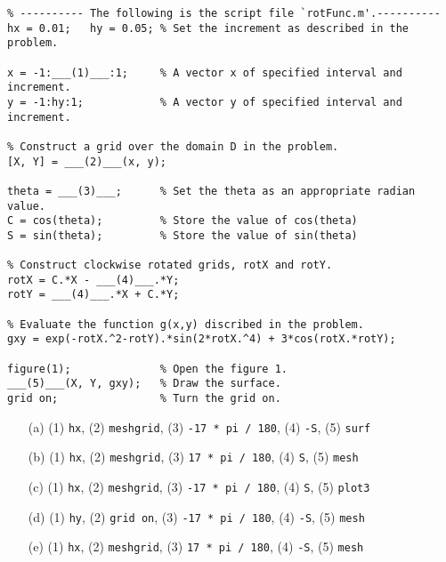 \documentclass[11pt,a4paper]{article}
\begin{document}
\begin{enumerate}
\begin{enumerate}
    \vspace{2mm}

    \begin{verbatim}
% ---------- The following is the script file `rotFunc.m'.----------
hx = 0.01;   hy = 0.05; % Set the increment as described in the problem.

x = -1:___(1)___:1;     % A vector x of specified interval and increment.
y = -1:hy:1;            % A vector y of specified interval and increment.

% Construct a grid over the domain D in the problem.
[X, Y] = ___(2)___(x, y);

theta = ___(3)___;      % Set the theta as an appropriate radian value.
C = cos(theta);         % Store the value of cos(theta)
S = sin(theta);         % Store the value of sin(theta)

% Construct clockwise rotated grids, rotX and rotY.
rotX = C.*X - ___(4)___.*Y;
rotY = ___(4)___.*X + C.*Y;

% Evaluate the function g(x,y) discribed in the problem.
gxy = exp(-rotX.^2-rotY).*sin(2*rotX.^4) + 3*cos(rotX.*rotY); 

figure(1);              % Open the figure 1.
___(5)___(X, Y, gxy);   % Draw the surface.
grid on;                % Turn the grid on.
    \end{verbatim}

    \begin{itemize}
        \item[(a)]
            (1) \verb"hx", (2) \verb"meshgrid", (3) \verb"-17 * pi / 180", (4) \verb"-S", (5) \verb"surf"
        \item[(b)]
            (1) \verb"hx", (2) \verb"meshgrid", (3) \verb"17 * pi / 180", (4) \verb"S", (5) \verb"mesh"
        \item[(c)]
            (1) \verb"hx", (2) \verb"meshgrid", (3) \verb"-17 * pi / 180", (4) \verb"S", (5) \verb"plot3"
        \item[(d)]
            (1) \verb"hy", (2) \verb"grid on", (3) \verb"-17 * pi / 180", (4) \verb"-S", (5) \verb"mesh"
        \item[(e)]
            (1) \verb"hx", (2) \verb"meshgrid", (3) \verb"17 * pi / 180", (4) \verb"-S", (5) \verb"mesh"
    \end{itemize}

\end{enumerate}

\end{enumerate}

\newpage
\end{document}
